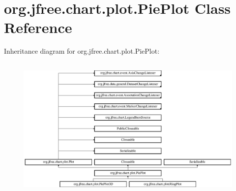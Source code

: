 \hypertarget{classorg_1_1jfree_1_1chart_1_1plot_1_1_pie_plot}{}\section{org.\+jfree.\+chart.\+plot.\+Pie\+Plot Class Reference}
\label{classorg_1_1jfree_1_1chart_1_1plot_1_1_pie_plot}
Inheritance diagram for org.\+jfree.\+chart.\+plot.\+Pie\+Plot\+:\begin{figure}[H]
\begin{center}
\leavevmode
\includegraphics[height=7.080460cm]{classorg_1_1jfree_1_1chart_1_1plot_1_1_pie_plot}
\end{center}
\end{figure}
